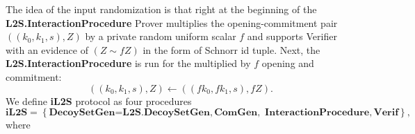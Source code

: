 \documentclass{mathcryptology} %
\theoremstyle{title}
\theoremstyle{titleof}
\begin{document}
    The idea of the input randomization is that right at the beginning of the \textbf{L2S.InteractionProcedure} Prover multiplies the opening-commitment pair $\left(\left(k_{0}, k_{1}, s\right), Z\right)$ by a private random uniform scalar $f$ and supports Verifier with an evidence of $\left(Z \sim  fZ\right)$ in the form of Schnorr id tuple.
    Next, the \textbf{L2S.InteractionProcedure} is run for the multiplied by $f$ opening and commitment:
    \begin{equation*}
        \left(\left(k_{0}, k_{1}, s\right), Z\right) \leftarrow \left(\left(fk_{0}, {fk}_{1}, s\right), fZ\right).
    \end{equation*}
    We define \textbf{iL2S} protocol as four procedures
    \begin{equation*}
        \textbf{iL2S} = \left\{\textbf{DecoySetGen=L2S.DecoySetGen}, \textbf{ComGen},\textbf{ InteractionProcedure}, \textbf{Verif}\right\},
    \end{equation*}
    where
\end{document}
